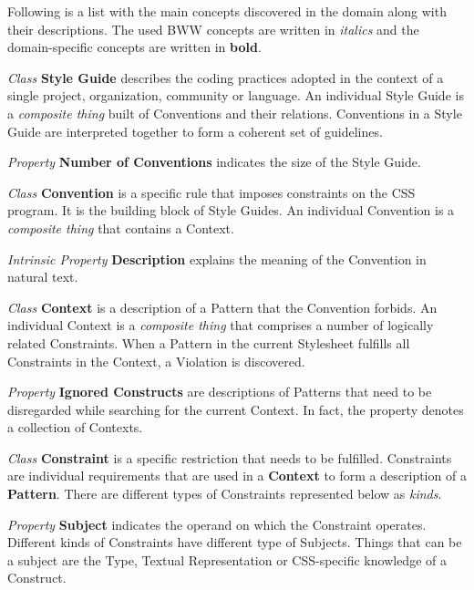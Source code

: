 \documentclass[parskip=full]{uvamscse}
\begin{document}
Following is a list with the main concepts discovered in the domain along with their descriptions.
The used BWW concepts are written in \textit{italics} and the domain-specific concepts are written
in \textbf{bold}.

\begin{description}

\item\textit{Class} \textbf{Style Guide} describes the coding practices adopted in the context of a single project, organization, community or language. An individual Style Guide is a \textit{composite thing} built of Conventions and their relations. Conventions in a Style Guide are interpreted together to form a coherent set of guidelines.

\textit{Property} \textbf{Number of Conventions} indicates the size of the Style Guide.


\item\textit{Class} \textbf{Convention} is a specific rule that imposes constraints on the CSS program. It is the building block of Style Guides. An individual Convention is a \textit{composite thing} that contains a Context.

\textit{Intrinsic Property} \textbf{Description} explains the meaning of the Convention in natural text.


\item\textit{Class} \textbf{Context} is a description of a Pattern that the Convention forbids. An individual Context is a \textit{composite thing} that comprises a number of logically related Constraints. When a Pattern in the current Stylesheet fulfills all Constraints in the Context, a Violation is discovered.

\textit{Property} \textbf{Ignored Constructs} are descriptions of Patterns that need to be disregarded while searching for the current Context. In fact, the property denotes a collection of Contexts.


\item\textit{Class} \textbf{Constraint} is a specific restriction that needs to be fulfilled. Constraints are individual requirements that are used in a \textbf{Context} to form a description of a \textbf{Pattern}. There are different types of Constraints represented below as \textit{kinds}.

\textit{Property} \textbf{Subject} indicates the operand on which the Constraint operates. Different kinds of Constraints have different type of Subjects.  Things that can be a subject are the Type, Textual
Representation or CSS-specific knowledge of a Construct.



\end{description}
\end{document}
